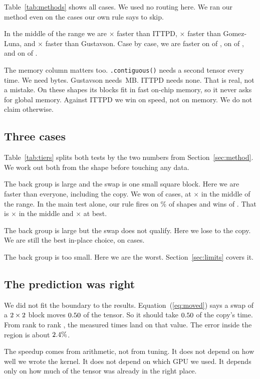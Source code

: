 Table~\ref{tab:methods} shows all \methTabCases{} cases. We used no routing
here. We ran our method even on the cases our own rule says to skip.

In the middle of the range we are \methTabIttpdX{}$\times$ faster than ITTPD,
\methTabGlX{}$\times$ faster than Gomez-Luna, and \methTabGvX{}$\times$ faster
than Gustavson. Case by case, we are faster on \resWinIttpd{} of
\resWinIttpdOf{}, on \resWinGl{} of \resWinGlOf{}, and on \resWinGv{} of
\resWinGvOf{}.

The memory column matters too. \texttt{.contiguous()} needs a second tensor
every time. We need \resBoxAux{} bytes. Gustavson needs \resGvAuxMB{}\,MB.
ITTPD needs none. That is real, not a mistake. On these shapes its blocks fit
in fast on-chip memory, so it never asks for global memory. Against ITTPD we
win on speed, not on memory. We do not claim otherwise.



\subsection{Three cases}
\label{sec:gate}

Table~\ref{tab:tiers} splits both tests by the two numbers from
Section~\ref{sec:method}. We work out both from the shape before touching any
data.

The back group is large and the swap is one small square block. Here we are
faster than everyone, including the copy. We won \tierBeatsCases{} of
\tierBeatsCases{} cases, at \tierBeatsX{}$\times$ in the middle of the range.
In the main test alone, our rule fires on \gateShare{}\% of shapes and wins
\gateWins{} of \gateCases{}. That is \gateMedianX{}$\times$ in the middle and
\gateBestX{}$\times$ at best.

The back group is large but the swap does not qualify. Here we lose to the
copy. We are still the best in-place choice, on \tierInplaceCases{} cases.

The back group is too small. Here we are the worst. Section~\ref{sec:limits}
covers it.

\subsection{The prediction was right}

We did not fit the boundary to the results. Equation~(\ref{eq:moved}) says a
swap of a $2 \times 2$ block moves
$0.50$ of the tensor. So it should take $0.50$ of the
copy's time. From rank \resRankLo{} to rank \resRankHi{}, the measured times
land on that value. The error inside the region is about $2.4\%$.

The speedup comes from arithmetic, not from tuning. It does not depend on how
well we wrote the kernel. It does not depend on which GPU we used. It depends
only on how much of the tensor was already in the right place.
